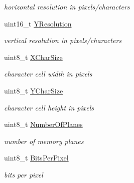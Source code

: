 \begin{DoxyCompactItemize}
\begin{DoxyCompactList}\small\item\em horizontal resolution in pixels/characters \end{DoxyCompactList}\item 
\hypertarget{struct____attribute_____afa8aba2156994750d500f85d0f8425cb}{}\label{struct____attribute_____afa8aba2156994750d500f85d0f8425cb} 
uint16\+\_\+t \hyperlink{struct____attribute_____afa8aba2156994750d500f85d0f8425cb}{Y\+Resolution}
\begin{DoxyCompactList}\small\item\em vertical resolution in pixels/characters \end{DoxyCompactList}\item 
\hypertarget{struct____attribute_____a047d8f41434f02589d0c9b90b17c67eb}{}\label{struct____attribute_____a047d8f41434f02589d0c9b90b17c67eb} 
uint8\+\_\+t \hyperlink{struct____attribute_____a047d8f41434f02589d0c9b90b17c67eb}{X\+Char\+Size}
\begin{DoxyCompactList}\small\item\em character cell width in pixels \end{DoxyCompactList}\item 
\hypertarget{struct____attribute_____a330f00ebd49dccd2325d43cdbd646f09}{}\label{struct____attribute_____a330f00ebd49dccd2325d43cdbd646f09} 
uint8\+\_\+t \hyperlink{struct____attribute_____a330f00ebd49dccd2325d43cdbd646f09}{Y\+Char\+Size}
\begin{DoxyCompactList}\small\item\em character cell height in pixels \end{DoxyCompactList}\item 
\hypertarget{struct____attribute_____a51268efaac55d78e17263aff9a447998}{}\label{struct____attribute_____a51268efaac55d78e17263aff9a447998} 
uint8\+\_\+t \hyperlink{struct____attribute_____a51268efaac55d78e17263aff9a447998}{Number\+Of\+Planes}
\begin{DoxyCompactList}\small\item\em number of memory planes \end{DoxyCompactList}\item 
\hypertarget{struct____attribute_____a03756ae144fce823087a2a4255bf4bb1}{}\label{struct____attribute_____a03756ae144fce823087a2a4255bf4bb1} 
uint8\+\_\+t \hyperlink{struct____attribute_____a03756ae144fce823087a2a4255bf4bb1}{Bits\+Per\+Pixel}
\begin{DoxyCompactList}\small\item\em bits per pixel \end{DoxyCompactList}\item 

\end{DoxyCompactItemize}
